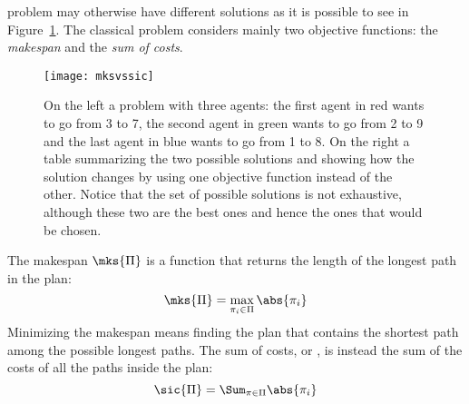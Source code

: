 problem may otherwise have different solutions as it is possible to see in
Figure~\ref{fig:mksvssic}. The classical problem considers mainly two objective
functions: the \textit{makespan} and the \textit{sum of costs}. 
\begin{figure}[t]
  \centering
  \begin{minipage}{0.38\linewidth}
    \texttt{[image: mksvssic]}
  \end{minipage}
  \hfill
  
  \caption{On the left a  problem with three agents: the first agent
  in red wants to go from 3 to 7, the second agent in green wants to go from 2
  to 9 and the last agent in blue wants to go from 1 to 8. On the right a table
  summarizing the two possible solutions and showing how the solution changes
  by using one objective function instead of the other. Notice that the set of
  possible solutions is not exhaustive, although these two are the best ones 
  and hence the ones that would be chosen.}
  \label{fig:mksvssic}
\end{figure}
\newline
The makespan $\mks{\Pi}$ is a function that returns the length of the longest
path in the plan:
\begin{equation}
  \mks{\Pi}=\max\limits_{\pi_i\in\Pi}\abs{\pi_i}
  \label{eq:mks}
\end{equation}
Minimizing the makespan means finding the plan that contains the shortest path
among the possible longest paths. \newline
The sum of costs, or , is instead the sum of the costs of all the
paths inside the plan:
\begin{equation}
  \sic{\Pi}=\Sum_{\pi\in\Pi}\abs{\pi_i}
  \label{eq:sic}
\end{equation}
%
%
